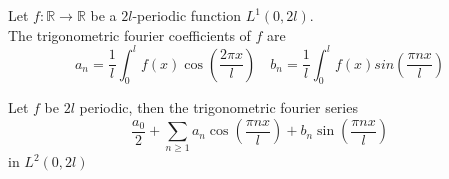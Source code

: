 \documentclass[../main.tex]{subfiles}
\begin{document}
\begin{defn}
	Let $f: \mathbb{R}\to \mathbb{R}$ be a $2l$-periodic function $ L^{1}( 0,2l) $.\\
	The trigonometric fourier coefficients of $f$ are
	\[ 
	a_n = \frac{1}{l} \int_{ 0 }^{ l } f( x) \cos( \frac{2\pi x}{l}) \quad b_n = \frac{1}{l} \int_{ 0 }^{ l }f( x) sin( \frac{\pi n x}{l}) 
	\]
	
\end{defn}
\begin{crly}
Let $f$ be $2l$ periodic, then the trigonometric fourier series
\[ 
\frac{a_0}{2} + \sum_{n \geq 1}^{ } a_n \cos(  \frac{\pi n x }{l}) + b_n \sin( \frac{\pi n x}{l}) 
\]
in $L^{2}( 0,2l) $ 
\end{crly}
\end{document}
